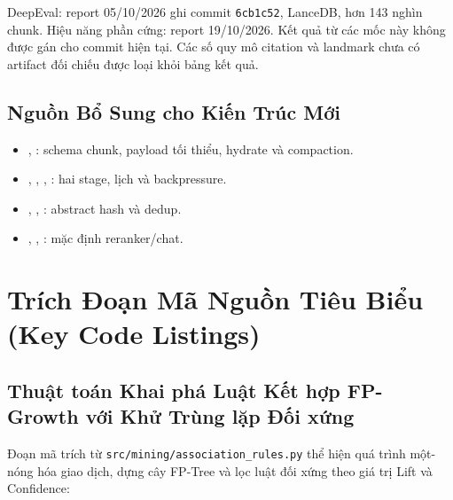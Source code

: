 DeepEval: report 05/10/2026 ghi commit \texttt{6cb1c52}, LanceDB, hơn 143 nghìn chunk. Hiệu năng phần cứng: report 19/10/2026. Kết quả từ các mốc này không được gán cho commit hiện tại. Các số quy mô citation và landmark chưa có artifact đối chiếu được loại khỏi bảng kết quả.

\subsection{Nguồn Bổ Sung cho Kiến Trúc Mới}
\begin{itemize}
\item {}, : schema chunk, payload tối thiểu, hydrate và compaction.
\item {}, , , : hai stage, lịch và backpressure.
\item {}, , : abstract hash và dedup.
\item {}, , : mặc định reranker/chat.
\end{itemize}

\section{Trích Đoạn Mã Nguồn Tiêu Biểu (Key Code Listings)}

\subsection{Thuật toán Khai phá Luật Kết hợp FP-Growth với Khử Trùng lặp Đối xứng}
Đoạn mã trích từ \texttt{src/mining/association\_rules.py} thể hiện quá trình một-nóng hóa giao dịch, dựng cây FP-Tree và lọc luật đối xứng theo giá trị Lift và Confidence:

